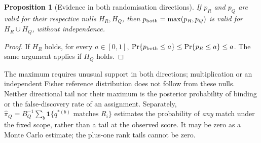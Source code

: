 \documentclass[10pt,a4paper]{article}
\newtheorem{proposition}{Proposition}
\theoremstyle{definition}
\begin{document}
\begin{proposition}[Evidence in both randomisation directions]
If $p_R$ and $p_Q$ are valid for their respective nulls $H_R,H_Q$, then
$p_{\rm both}=\max(p_R,p_Q)$ is valid for $H_R\cup H_Q$, without independence.
\end{proposition}
\begin{proof}
If $H_R$ holds, for every $a\in[0,1]$,
$\Pr\{p_{\rm both}\le a\}\le\Pr\{p_R\le a\}\le a$.
The same argument applies if $H_Q$ holds.
\end{proof}
The maximum requires unusual support in both directions; multiplication or an independent Fisher reference distribution does not follow from these nulls.
Neither directional tail nor their maximum is the posterior probability of binding or the false-discovery rate of an assignment.
Separately, $\widehat\pi_Q=B_Q^{-1}\sum_b\mathbf1\{q^{*(b)}\text{ matches }R_i\}$ estimates the probability of \emph{any} match under the fixed scope, rather than a tail at the observed score.
It may be zero as a Monte Carlo estimate; the plus-one rank tails cannot be zero.
\end{document}
